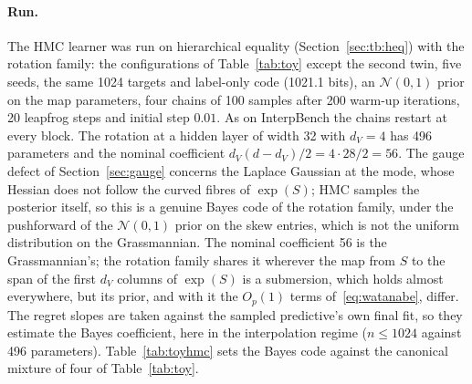 \documentclass[11pt,a4paper]{article}
\newcommand{\dv}{d_V}
\begin{document}
\paragraph{Run.} The HMC learner was run on hierarchical equality (Section~\ref{sec:tb:heq}) with the rotation family: the configurations of Table~\ref{tab:toy} except the second twin, five seeds, the same 1024 targets and label-only code (1021.1 bits), an $\mathcal N(0,1)$ prior on the map parameters, four chains of 100 samples after 200 warm-up iterations, 20 leapfrog steps and initial step $0.01$. As on InterpBench the chains restart at every block. The rotation at a hidden layer of width 32 with $\dv=4$ has 496 parameters and the nominal coefficient $\dv(d-\dv)/2=4\cdot28/2=56$. The gauge defect of Section~\ref{sec:gauge} concerns the Laplace Gaussian at the mode, whose Hessian does not follow the curved fibres of $\exp(S)$; HMC samples the posterior itself, so this is a genuine Bayes code of the rotation family, under the pushforward of the $\mathcal N(0,1)$ prior on the skew entries, which is not the uniform distribution on the Grassmannian. The nominal coefficient 56 is the Grassmannian's; the rotation family shares it wherever the map from $S$ to the span of the first $\dv$ columns of $\exp(S)$ is a submersion, which holds almost everywhere, but its prior, and with it the $O_p(1)$ terms of~\eqref{eq:watanabe}, differ. The regret slopes are taken against the sampled predictive's own final fit, so they estimate the Bayes coefficient, here in the interpolation regime ($n\le1024$ against 496 parameters). Table~\ref{tab:toyhmc} sets the Bayes code against the canonical mixture of four of Table~\ref{tab:toy}.
\end{document}
